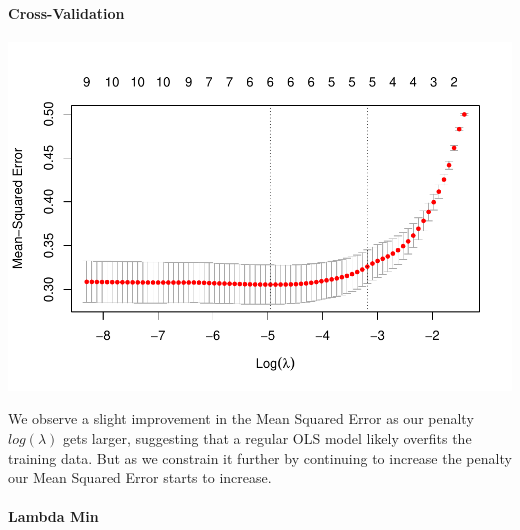 \documentclass[
]{article}
\newenvironment{Shaded}{\begin{snugshade}}{\end{snugshade}}
\newcommand{\AttributeTok}[1]{\textcolor[rgb]{0.77,0.63,0.00}{#1}}
\newcommand{\DecValTok}[1]{\textcolor[rgb]{0.00,0.00,0.81}{#1}}
\newcommand{\FunctionTok}[1]{\textcolor[rgb]{0.00,0.00,0.00}{#1}}
\newcommand{\NormalTok}[1]{#1}
\newcommand{\OtherTok}[1]{\textcolor[rgb]{0.56,0.35,0.01}{#1}}
\newcommand{\SpecialCharTok}[1]{\textcolor[rgb]{0.00,0.00,0.00}{#1}}
\newcommand{\StringTok}[1]{\textcolor[rgb]{0.31,0.60,0.02}{#1}}
\begin{document}
\hypertarget{cross-validation-1}{%
\paragraph{Cross-Validation}\label{cross-validation-1}}

\begin{Shaded}
\end{Shaded}

\begin{center}\includegraphics{TP3_MERR_HABBOU_KHIDOUR_files/figure-latex/unnamed-chunk-48-1} \end{center}

We observe a slight improvement in the Mean Squared Error as our penalty
\(log(\lambda)\) gets larger, suggesting that a regular OLS model likely
overfits the training data. But as we constrain it further by continuing
to increase the penalty our Mean Squared Error starts to increase.

\hypertarget{lambda-min-1}{%
\paragraph{Lambda Min}\label{lambda-min-1}}
\end{document}
